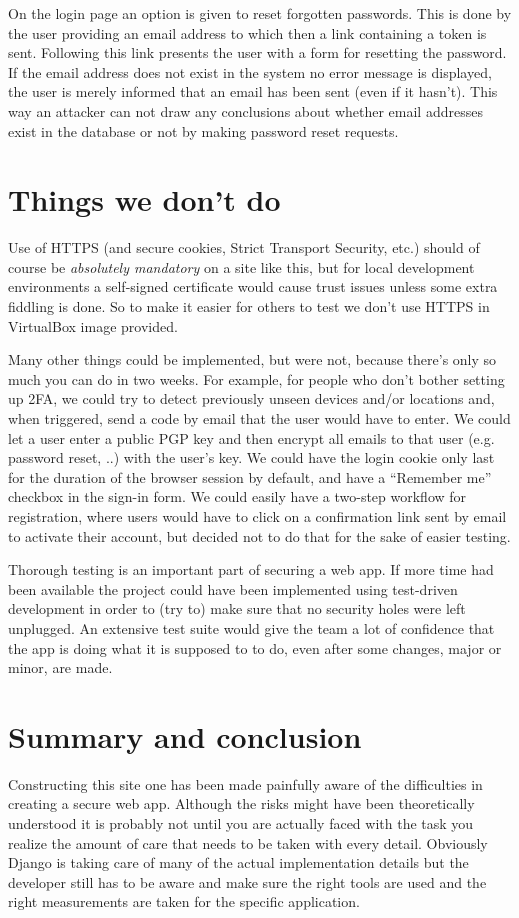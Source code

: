 \documentclass[11pt,english]{article}
\begin{document}
On the login page an option is given to reset forgotten passwords. This is done by the user providing an email address to which then a link containing a token is sent. Following this link presents the user with a form for resetting the password. If the email address does not exist in the system no error message is displayed, the user is merely informed that an email has been sent (even if it hasn’t). This way an attacker can not draw any conclusions about whether email addresses exist in the database or not by making password reset requests.

\section{Things we don't do}

Use of HTTPS (and secure cookies, Strict Transport Security, etc.) should of course be \emph{absolutely mandatory} on a site like this, but for local development environments a self-signed certificate would cause trust issues unless some extra fiddling is done. So to make it easier for others to test we don’t use HTTPS in VirtualBox image provided.

Many other things could be implemented, but were not, because there’s only so much you can do in two weeks. For example, for people who don’t bother setting up 2FA, we could try to detect previously unseen devices and/or locations and, when triggered, send a code by email that the user would have to enter. We could let a user enter a public PGP key and then encrypt all emails to that user (e.g. password reset, ..) with the user’s key. We could have the login cookie only last for the duration of the browser session by default, and have a “Remember me” checkbox in the sign-in form. We could easily have a two-step workflow for registration, where users would have to click on a confirmation link sent by email to activate their account, but decided not to do that for the sake of easier testing.

Thorough testing is an important part of securing a web app. If more time had been available the project could have been implemented using test-driven development in order to (try to) make sure that no security holes were left unplugged. An extensive test suite would give the team a lot of confidence that the app is doing what it is supposed to to do, even after some changes, major or minor, are made.

\section{Summary and conclusion}

Constructing this site one has been made painfully aware of the difficulties in creating a secure web app. Although the risks might have been theoretically understood it is probably not until you are actually faced with the task you realize the amount of care that needs to be taken with every detail. Obviously Django is taking care of many of the actual implementation details but the developer still has to be aware and make sure the right tools are used and the right measurements are taken for the specific application.
\end{document}
